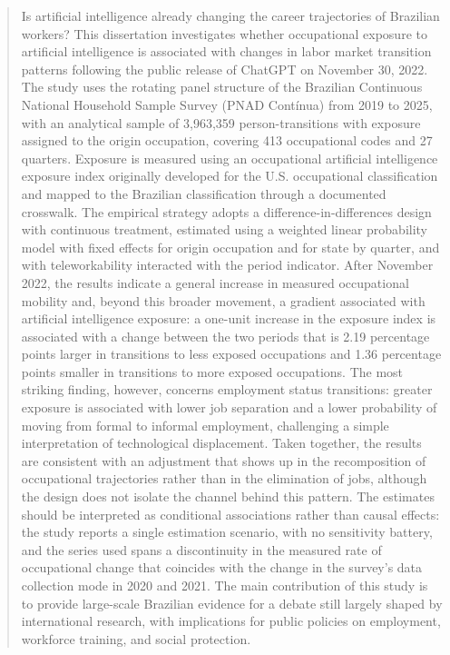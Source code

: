 
\begin{abstract}
Is artificial intelligence already changing the career trajectories of Brazilian
workers? This dissertation investigates whether occupational exposure to
artificial intelligence is associated with changes in labor market transition
patterns following the public release of ChatGPT on November 30, 2022. The study
uses the rotating panel structure of the Brazilian Continuous National Household
Sample Survey (PNAD Contínua) from 2019 to 2025, with an analytical sample of
3,963,359 person-transitions with exposure assigned to the origin occupation,
covering 413 occupational codes and 27 quarters. Exposure is measured using an
occupational artificial intelligence exposure index originally developed for the
U.S. occupational classification and mapped to the Brazilian classification
through a documented crosswalk. The empirical strategy adopts a
difference-in-differences design with continuous treatment, estimated using a
weighted linear probability model with fixed effects for origin occupation and
for state by quarter, and with teleworkability interacted with the period
indicator. After November 2022, the results indicate a general increase in
measured occupational mobility and, beyond this broader movement, a gradient
associated with artificial intelligence exposure: a one-unit increase in the
exposure index is associated with a change between the two periods that is 2.19
percentage points larger in transitions to less exposed occupations and 1.36
percentage points smaller in transitions to more exposed occupations. The most
striking finding, however, concerns employment status transitions: greater
exposure is associated with lower job separation and a lower probability of
moving from formal to informal employment, challenging a simple interpretation
of technological displacement. Taken together, the results are consistent with
an adjustment that shows up in the recomposition of occupational trajectories
rather than in the elimination of jobs, although the design does not isolate the
channel behind this pattern. The estimates should be interpreted as conditional
associations rather than causal effects: the study reports a single estimation
scenario, with no sensitivity battery, and the series used spans a discontinuity
in the measured rate of occupational change that coincides with the change in
the survey's data collection mode in 2020 and 2021. The main contribution of
this study is to provide large-scale Brazilian evidence for a debate still
largely shaped by international research, with implications for public policies
on employment, workforce training, and social protection.
\end{abstract}
